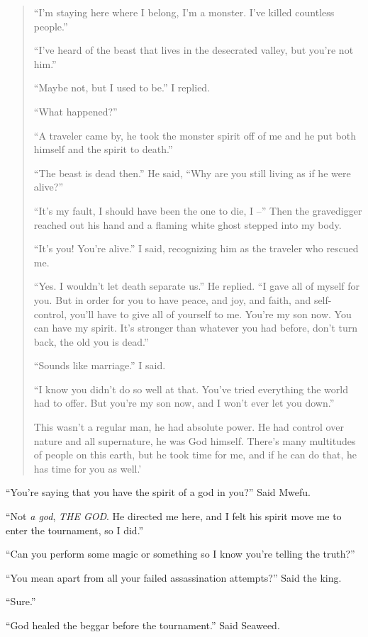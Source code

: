 \begin{quote}
``I'm staying here where I belong, I'm a monster. I've killed countless people.''

``I've heard of the beast that lives in the desecrated valley, but you're not him.''

``Maybe not, but I used to be.'' I replied.

``What happened?''

``A traveler came by, he took the monster spirit off of me and he put both himself and the spirit to death.''

``The beast is dead then.'' He said, ``Why are you still living as if he were alive?''

``It's my fault, I should have been the one to die, I --'' Then the gravedigger reached out his hand and a flaming white ghost stepped into my body.

``It's you! You're alive.'' I said, recognizing him as the traveler who rescued me.

``Yes. I wouldn't let death separate us.'' He replied.
``I gave all of myself for you. But in order for you to have peace, and joy, and faith, and self-control, you'll have to give all of yourself to me.
You're my son now. You can have my spirit.
It's stronger than whatever you had before, don't turn back, the old you is dead.''

``Sounds like marriage.'' I said.

``I know you didn't do so well at that. You've tried everything the world had to offer. But you're my son now, and I won't ever let you down.''

This wasn't a regular man, he had absolute power. He had control over nature and all supernature, he was God himself. There's many multitudes of people on this earth, but he took time for me, and if he can do that, he has time for you as well.'
\end{quote}

``You're saying that you have the spirit of a god in you?'' Said Mwe\-fu.

``Not \emph{a god}, \emph{THE GOD}. He directed me here, and I felt his spirit move me to enter the tournament, so I did.''

``Can you perform some magic or something so I know you're telling the truth?''

``You mean apart from all your failed assassination attempts?'' Said the king.

``Sure.''

``God healed the beggar before the tournament.'' Said Seaweed.

